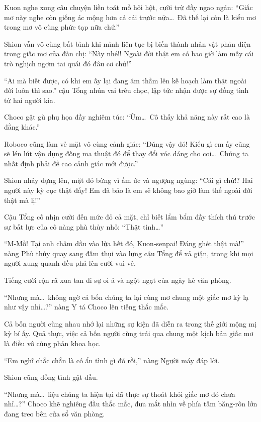 \documentclass[../main.tex]{subfiles}
\begin{document}
Kuon nghe xong câu chuyện liền toát mồ hôi hột, cười trừ đầy ngao ngán:
``Giấc mơ này nghe còn giống ác mộng hơn cả cái trước nữa\dots\ Đã thế lại còn là kiểu mơ trong mơ vô cùng phức tạp nữa chứ.''

Shion vẫn vô cùng bất bình khi mình liên tục bị biến thành nhân vật phản diện trong giấc mơ của đàn chị:
``Này nhé!! Ngoài đời thật em có bao giờ làm mấy cái trò nghịch ngợm tai quái đó đâu cơ chứ!''

``Ai mà biết được, có khi em ấy lại đang âm thầm lên kế hoạch làm thật ngoài đời luôn thì sao.'' cậu Tổng nhún vai trêu chọc, lập tức nhận được sự đồng tình từ hai người kia.

Choco gật gù phụ họa đầy nghiêm túc:
``Ừm\dots\ Cô thấy khả năng này rất cao là đằng khác.''

Roboco cũng làm vẻ mặt vô cùng cảnh giác:
``Đúng vậy đó! Kiểu gì em ấy cũng sẽ lén lút vận dụng đống ma thuật đó để thay đổi vóc dáng cho coi\dots\ Chúng ta nhất định phải đề cao cảnh giác mới được.''

Shion nhảy dựng lên, mặt đỏ bừng vì ấm ức và ngượng ngùng:
``Cái gì chứ!? Hai người này kỳ cục thật đấy! Em đã bảo là em sẽ không bao giờ làm thế ngoài đời thật mà lị!''

Cậu Tổng cố nhịn cười đến mức đỏ cả mặt, chỉ biết lẩm bẩm đầy thích thú trước sự bất lực của cô nàng phù thủy nhỏ:
``Thật tình\dots''

``M-Mồ! Tại anh châm dầu vào lửa hết đó, Kuon-senpai! Đáng ghét thật mà!'' nàng Phù thủy quay sang đấm thụi vào lưng cậu Tổng để xả giận, trong khi mọi người xung quanh đều phá lên cười vui vẻ.

Tiếng cười rộn rã xua tan đi sự oi ả và ngột ngạt của ngày hè văn phòng.

\ct

``Nhưng mà\dots\ không ngờ cả bốn chúng ta lại cùng mơ chung một giấc mơ kỳ lạ như vậy nhỉ\dots?'' nàng Y tá Choco lên tiếng thắc mắc.

Cả bốn người cùng nhau nhớ lại những sự kiện đã diễn ra trong thế giới mộng mị kỳ bí ấy. Quả thực, việc cả bốn người cùng trải qua chung một kịch bản giấc mơ là điều vô cùng phản khoa học.

``Em nghĩ chắc chắn là có ẩn tình gì đó rồi,'' nàng Người máy đáp lời.

Shion cũng đồng tình gật đầu.

``Nhưng mà\dots\ liệu chúng ta hiện tại đã thực sự thoát khỏi giấc mơ đó chưa nhỉ\dots?'' Choco khẽ nghiêng đầu thắc mắc, đưa mắt nhìn về phía tấm băng-rôn lớn đang treo bên cửa sổ văn phòng.
\end{document}
